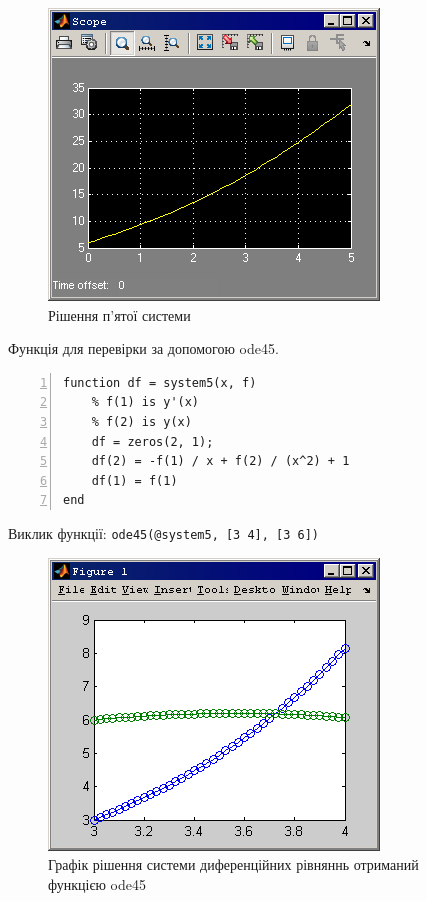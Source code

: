\documentclass[a4paper, 10pt]{article}
\begin{document}
\begin{enumerate}
{\begin{enumerate}
{		\begin{figure}[H]
		\begin{center}
		\includegraphics{lab2_5_sol.png}
		\caption{Рішення п'ятої системи}
		\end{center}
		\end{figure}

		\noindent
		Функція для перевірки за допомогою ode45.
		\begin{lstlisting}[numbers=left]
function df = system5(x, f)
    % f(1) is y'(x)
    % f(2) is y(x)
    df = zeros(2, 1);
    df(2) = -f(1) / x + f(2) / (x^2) + 1
    df(1) = f(1)
end
		\end{lstlisting}

		Виклик функції: \texttt{ode45(@system5, [3 4], [3 6])}

		\begin{figure}[H]
		\begin{center}
		\includegraphics{lab2_5_ode45.png}
		\caption{Графік рішення системи диференційних рівняннь отриманий функцією ode45}
		\end{center}
		\end{figure}
	}
	\end{enumerate}
}
\end{enumerate}
\end{document}
